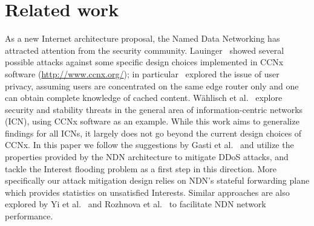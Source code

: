 \section{Related work}
\label{sec:related-work}

As a new Internet architecture proposal, the Named Data Networking has attracted attention from the security community. 
Lauinger~\cite{Lauinger:2010:Security--scalability} showed several possible attacks against some specific design choices implemented in CCNx software (\url{http://www.ccnx.org/}); in particular~\cite{Lauinger:2010:Security--scalability} explored the issue of user privacy, assuming users are concentrated on the same edge router only and one can obtain complete knowledge of cached content.  
W\"ahlisch et al.~\cite{Wahlisch:2012:Backscatter-from} explore security and stability threats in the general area of information-centric networks (ICN), using CCNx software as an example.  
While this work aims to generalize findings for all ICNs, it largely does not go beyond the current design choices of CCNx.
In this paper we follow the suggestions by Gasti et al.~\cite{gasti2012ddos} and utilize the properties provided by the NDN architecture to mitigate DDoS attacks, and tackle the Interest flooding problem as a first step in this direction.
More specifically our attack mitigation design relies on NDN's stateful forwarding plane 
which provides statistics on unsatisfied Interests.  
Similar approaches are also explored by Yi et al.~\cite{adaptive-forwarding,adaptive-tr} and Rozhnova et al.~\cite{rozhnova2012effective} to facilitate NDN network performance.

